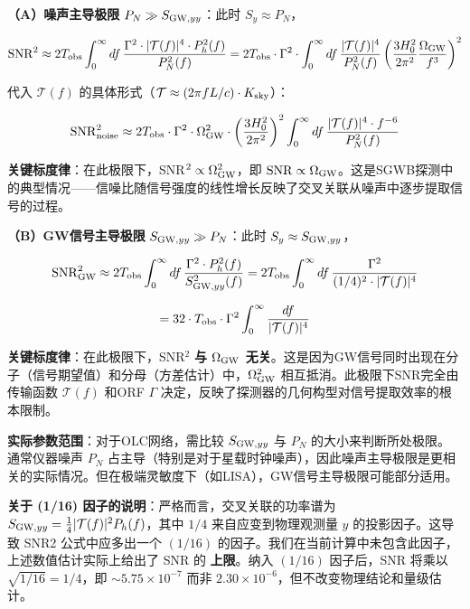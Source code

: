 \documentclass[12pt,a4paper]{article}
\begin{document}
\textbf{（A）噪声主导极限} $P_N \gg S_{{\rm GW},yy}$：此时 $S_y \approx P_N$，

$${\rm SNR}^2 \approx 2 T_{\rm obs} \int_0^\infty df\, \frac{\Gamma^2 \cdot |\mathcal{T}(f)|^4 \cdot P_h^2(f)}{P_N^2(f)} = 2 T_{\rm obs} \cdot \Gamma^2 \cdot \int_0^\infty df\, \frac{|\mathcal{T}(f)|^4}{P_N^2(f)} \left( \frac{3H_0^2}{2\pi^2} \frac{\Omega_{\rm GW}}{f^3} \right)^2$$

代入 $\mathcal{T}(f)$ 的具体形式（$\mathcal{T} \approx (2\pi f L/c) \cdot K_{\rm sky}$）：

$${\rm SNR}^2_{\rm noise} \approx 2 T_{\rm obs} \cdot \Gamma^2 \cdot \Omega_{\rm GW}^2 \cdot \left( \frac{3H_0^2}{2\pi^2} \right)^2 \int_0^\infty df\, \frac{|\mathcal{T}(f)|^4 \cdot f^{-6}}{P_N^2(f)}$$

\textbf{关键标度律}：在此极限下，SNR$^2 \propto \Omega_{\rm GW}^2$，即 ${\rm SNR} \propto \Omega_{\rm GW}$。这是SGWB探测中的典型情况——信噪比随信号强度的线性增长反映了交叉关联从噪声中逐步提取信号的过程。

\textbf{（B）GW信号主导极限} $S_{{\rm GW},yy} \gg P_N$：此时 $S_y \approx S_{{\rm GW},yy}$，

$${\rm SNR}^2_{\rm GW} \approx 2 T_{\rm obs} \int_0^\infty df\, \frac{\Gamma^2 \cdot P_h^2(f)}{S_{{\rm GW},yy}^2(f)} = 2 T_{\rm obs} \int_0^\infty df\, \frac{\Gamma^2}{(1/4)^2 \cdot |\mathcal{T}(f)|^4}$$

$$= 32 \cdot T_{\rm obs} \cdot \Gamma^2 \int_0^\infty \frac{df}{|\mathcal{T}(f)|^4}$$

\textbf{关键标度律}：在此极限下，SNR$^2$ \textbf{与 $\Omega_{\rm GW}$ 无关}。这是因为GW信号同时出现在分子（信号期望值）和分母（方差估计）中，$\Omega_{\rm GW}^2$ 相互抵消。此极限下SNR完全由传输函数 $\mathcal{T}(f)$ 和ORF $\Gamma$ 决定，反映了探测器的几何构型对信号提取效率的根本限制。

\textbf{实际参数范围}：对于OLC网络，需比较 $S_{{\rm GW},yy}$ 与 $P_N$ 的大小来判断所处极限。通常仪器噪声 $P_N$ 占主导（特别是对于星载时钟噪声），因此噪声主导极限是更相关的实际情况。但在极端灵敏度下（如LISA），GW信号主导极限可能部分适用。

\textbf{关于 (1/16) 因子的说明}：严格而言，交叉关联的功率谱为 $S_{{\rm GW},yy} = \frac{1}{4}|\mathcal{T}(f)|^2 P_h(f)$，其中 $1/4$ 来自应变到物理观测量 $y$ 的投影因子。这导致 SNR2 公式中应多出一个 $(1/16)$ 的因子。我们在当前计算中未包含此因子，上述数值估计实际上给出了 SNR 的 \textbf{上限}。纳入 $(1/16)$ 因子后，SNR 将乘以 $\sqrt{1/16} = 1/4$，即 $\sim 5.75\times 10^{-7}$ 而非 $2.30\times 10^{-6}$，但不改变物理结论和量级估计。
\end{document}
